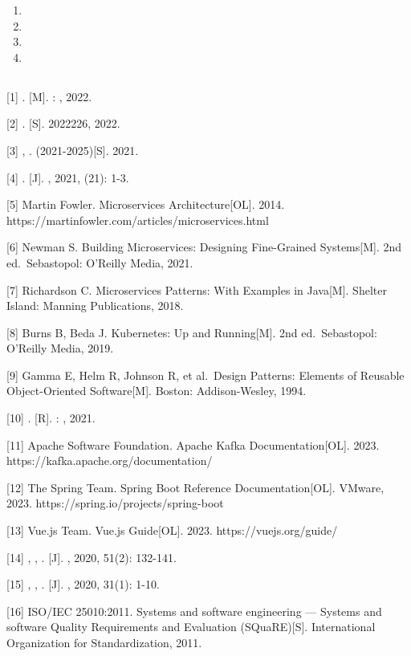 \begin{enumerate}
\def\labelenumi{\arabic{enumi}.}
\item
  \important{}
\item
  \important{}
\item
  \important{}
\item
  \important{}
\end{enumerate}

\hypertarget{section-26}{%
\subsection{}\label{section-26}}

{[}1{]} . {[}M{]}. : , 2022.

{[}2{]} . {[}S{]}. 2022226, 2022.

{[}3{]} , . (2021-2025){[}S{]}. 2021.

{[}4{]} . {[}J{]}. , 2021, (21): 1-3.

{[}5{]} Martin Fowler. Microservices Architecture{[}OL{]}. 2014.
https://martinfowler.com/articles/microservices.html

{[}6{]} Newman S. Building Microservices: Designing Fine-Grained
Systems{[}M{]}. 2nd ed.~Sebastopol: O'Reilly Media, 2021.

{[}7{]} Richardson C. Microservices Patterns: With Examples in
Java{[}M{]}. Shelter Island: Manning Publications, 2018.

{[}8{]} Burns B, Beda J. Kubernetes: Up and Running{[}M{]}. 2nd
ed.~Sebastopol: O'Reilly Media, 2019.

{[}9{]} Gamma E, Helm R, Johnson R, et al.~Design Patterns: Elements of
Reusable Object-Oriented Software{[}M{]}. Boston: Addison-Wesley, 1994.

{[}10{]} . {[}R{]}. : , 2021.

{[}11{]} Apache Software Foundation. Apache Kafka Documentation{[}OL{]}.
2023. https://kafka.apache.org/documentation/

{[}12{]} The Spring Team. Spring Boot Reference Documentation{[}OL{]}.
VMware, 2023. https://spring.io/projects/spring-boot

{[}13{]} Vue.js Team. Vue.js Guide{[}OL{]}. 2023.
https://vuejs.org/guide/

{[}14{]} , , . {[}J{]}. , 2020, 51(2): 132-141.

{[}15{]} , , . {[}J{]}. , 2020, 31(1): 1-10.

{[}16{]} ISO/IEC 25010:2011. Systems and software engineering ---
Systems and software Quality Requirements and Evaluation
(SQuaRE){[}S{]}. International Organization for Standardization, 2011.

